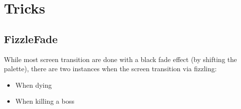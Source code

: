 \section{Tricks}






\subsection{FizzleFade}
While most screen transition are done with a black fade effect (by shifting the palette), there are two instances
when the screen transition via fizzling:
\begin{itemize}
	\item When dying
	\item When killing a boss
\end{itemize}




\begin{minipage}{\textwidth}
\centering
  \\
  \vspace*{0.5cm}
  \\
\end{minipage}

\begin{minipage}{\textwidth}
\centering
   \\
  \vspace*{0.5cm}
   \\
\end{minipage}


\begin{minipage}{\textwidth}
\centering
   \\
  \vspace*{0.5cm}
    \\
\end{minipage}

\begin{minipage}{\textwidth}
\centering
  \\
\vspace*{0.5cm}
  \\
\end{minipage}


